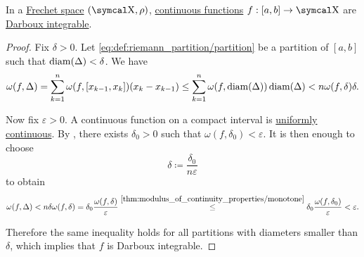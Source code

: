 \begin{proposition}\label{thm:countinuous_functions_integrable}
  In a \hyperref[def:frechet_space]{Frechet space} \( (\CX, \rho) \), \hyperref[def:global_continuity]{continuous functions} \( f: [a, b] \to \CX \) are \hyperref[def:darboux_integrability]{Darboux integrable}.
\end{proposition}
\begin{proof}
  Fix \( \delta > 0 \). Let \eqref{eq:def:riemann_partition/partition} be a partition of \( [a, b] \) such that \( \operatorname{diam}(\Delta) < \delta \). We have
  \begin{equation*}
    \omega(f, \Delta)
    =
    \sum_{k=1}^n \omega(f, [x_{k-1}, x_k]) (x_k - x_{k-1})
    \leq
    \sum_{k=1}^n \omega(f, \operatorname{diam}(\Delta)) \operatorname{diam}(\Delta)
    <
    n \omega(f, \delta) \delta.
  \end{equation*}

  Now fix \( \varepsilon > 0 \). A continuous function on a compact interval is \hyperref[def:uniform_continuity]{uniformly continuous}. By , there exists \( \delta_0 > 0 \) such that \( \omega(f, \delta_0) < \varepsilon \). It is then enough to choose
  \begin{equation*}
    \delta \coloneqq \frac {\delta_0} {n \varepsilon}
  \end{equation*}
  to obtain
  \begin{equation*}
    \omega(f, \Delta)
    <
    n \delta \omega(f, \delta)
    =
    \delta_0 \frac {\omega(f, \delta)} {\varepsilon}
    \overset {\ref{thm:modulus_of_continuity_properties/monotone}} \leq
    \delta_0 \frac {\omega(f, \delta_0)} {\varepsilon}
    <
    \varepsilon.
  \end{equation*}

  Therefore the same inequality holds for all partitions with diameters smaller than \( \delta \), which implies that \( f \) is Darboux integrable.
\end{proof}

